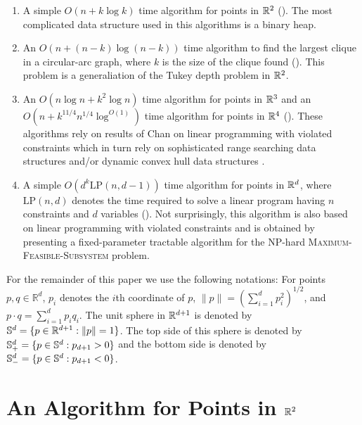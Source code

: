 \documentclass[charterfonts,lotsofwhite]{patmorin}
\newcommand{\lp}{\mathrm{LP}}
\begin{document}
\begin{enumerate}
\item A simple $O(n + k\log k)$ time algorithm for points in $\mathbb{R}^2$
().  The most complicated data structure used in this
algorithms is a binary heap.

\item An $O(n + (n-k)\log(n-k))$ time algorithm to find the largest
clique in a circular-arc graph, where $k$ is the size of the clique
found ().  This problem is a generaliation of the
Tukey depth problem in $\mathbb{R}^2$.

\item An $O(n\log n + k^2\log n)$ time algorithm for points in $\mathbb{R}^3$
and an $O(n + k^{11/4}n^{1/4}\log^{O(1)})$ time algorithm for points
in $\mathbb{R}^4$ ().  These algorithms rely on results of Chan
on linear programming with violated constraints \cite{X} which in turn
rely on sophisticated range searching data structures \cite{X} and/or
dynamic convex hull data structures \cite{X}.

\item A simple $O(d^k \lp(n,d-1))$ time algorithm for points in
$\mathbb{R}^d$, where $\lp(n,d)$ denotes the time required to solve a linear
program having $n$ constraints and $d$ variables ().
Not surprisingly, this algorithm is also based on linear programming
with violated constraints and is obtained by presenting a
fixed-parameter tractable algorithm for
the NP-hard \textsc{Maximum-Feasible-Subsystem} problem.
\end{enumerate}

For the remainder of this paper we use the following notations: For
points $p,q\in\mathbb{R}^d$, $p_i$ denotes the $i$th coordinate of
$p$, $\|p\|=(\sum_{i=1}^d p_i^2)^{1/2}$, and $p\cdot
q=\sum_{i=1}^d p_iq_i$.  The unit sphere in $\mathbb{R}^{d+1}$ is denoted by
$\mathbb{S}^d =\{ p\in\mathbb{R}^{d+1} : \|p\|=1\}$. The top side of this sphere is
denoted by $\mathbb{S}^d_+ =\{ p\in\mathbb{S}^{d} : p_{d+1} > 0 \}$ and the bottom
side is denoted by $\mathbb{S}^d_- =\{ p\in\mathbb{S}^{d} : p_{d+1} < 0 \}$.



\section{An Algorithm for Points in $\mathbb{R}^2$}
\end{document}
